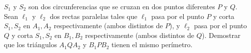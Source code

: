 $S_1$ y $S_2$ son dos circunferencias que se cruzan en dos puntos diferentes $P$ y $Q$. Sean $\ell_1$ y $\ell_2$ dos rectas paralelas tales que $\ell_1$ pasa por el punto $P$ y corta $S_1,S_2$ en $A_1,A_2$ respectivamente (ambos distintos de $P$), y $\ell_2$ pasa por el punto $Q$ y corta $S_1,S_2$ en $B_1,B_2$ respectivamente (ambos distintos de $Q$).
Demostrar que los triángulos $A_1QA_2$ y $B_1PB_2$ tienen el mismo perímetro.
